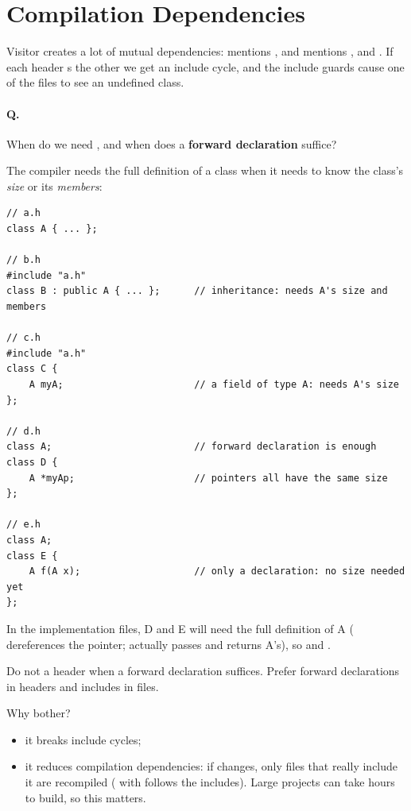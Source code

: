 \section{Compilation Dependencies}
Visitor creates a lot of mutual dependencies:  mentions
, and  mentions , 
and . If each header s the other we get an include
cycle, and the include guards cause one of the files to see an undefined class.

\paragraph{Q.} When do we need , and when does a
\textbf{forward declaration}  suffice?

The compiler needs the full definition of a class when it needs to know the
class's \emph{size} or its \emph{members}:
\begin{lstlisting}[style=cpp]
// a.h
class A { ... };

// b.h
#include "a.h"
class B : public A { ... };      // inheritance: needs A's size and members

// c.h
#include "a.h"
class C {
    A myA;                       // a field of type A: needs A's size
};

// d.h
class A;                         // forward declaration is enough
class D {
    A *myAp;                     // pointers all have the same size
};

// e.h
class A;
class E {
    A f(A x);                    // only a declaration: no size needed yet
};
\end{lstlisting}
In the implementation files, D and E will need the full definition of A
( dereferences the pointer;  actually passes and returns
A's), so  and  .

\begin{important}[Advice]
Do not  a header when a forward declaration suffices. Prefer
forward declarations in headers and includes in  files.
\end{important}
Why bother?
\begin{itemize}
  \item it breaks include cycles;
  \item it reduces compilation dependencies: if  changes, only files
        that really include it are recompiled ( with 
        follows the includes). Large projects can take hours to build, so this
        matters.
\end{itemize}

